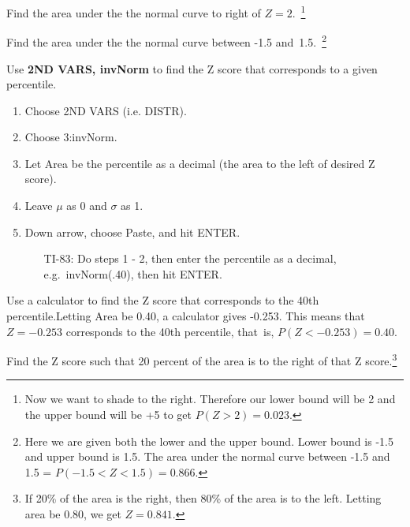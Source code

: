 \begin{exercise}
Find the area under the the normal curve to right of $Z=2$.~\footnote{Now we want to shade to the right. Therefore our lower bound will be 2 and the upper bound will be +5 to get $P(Z > 2) = 0.023$.}
\end{exercise}

\begin{exercise}Find the area under the the normal curve between -1.5 and~1.5.~\footnote{Here we are given both the lower and the upper bound. Lower bound is -1.5 and upper bound is 1.5. The area under the normal curve between -1.5 and 1.5 = $P(-1.5 < Z < 1.5) = 0.866$.}
\end{exercise}

\begin{termBox}{
Use \textbf{2ND VARS, invNorm} to find the Z score that corresponds to a given percentile.
\begin{enumerate}
\setlength{\itemsep}{0mm}
\item Choose 2ND VARS (i.e. DISTR).
\item Choose 3:invNorm.
\item Let Area be the percentile as a decimal (the area to the left of desired Z score).
\item Leave $\mu$ as 0 and $\sigma$ as 1.
\item Down arrow, choose Paste, and hit ENTER.\vspace{-1.5mm}
\begin{itemize}
\item[TI-83: ] Do steps 1 - 2, then enter the percentile as a decimal, e.g.~\mbox{invNorm(.40),} then hit ENTER.
\end{itemize}
\end{enumerate}
}
\end{termBox}

\begin{example}{Use a calculator to find the Z score that corresponds to the 40th percentile.}Letting Area be 0.40, a calculator gives -0.253. This means that $Z = -0.253$ corresponds to the 40th percentile, that~is, $P(Z < -0.253) = 0.40$.
\end{example}

\begin{exercise}Find the Z score such that 20 percent of the area is to the right of that Z score.\footnote{If 20\% of the area is the right, then 80\% of the area is to the left. Letting area be 0.80, we get $Z = 0.841$.}
\end{exercise}	

